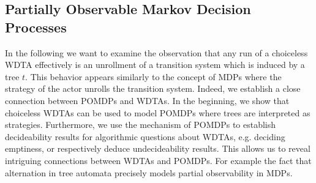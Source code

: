 \subsection{Partially Observable Markov Decision Processes}
\label{sec:modellingpomdp}
In the following we want to examine the observation that any run of a
choiceless \ac{WDTA} effectively is an unrollment of a transition system
which is induced by a tree $t$. This behavior appears similarly to the
concept of \acp{MDP} where the strategy of the actor unrolls the transition
system. Indeed, we establish a close connection between \acp{POMDP} and
\acp{WDTA}. In the beginning, we show that choiceless \acp{WDTA} can be used to
model \acp{POMDP} where trees are interpreted as strategies. Furthermore, we
use the mechanism of \acp{POMDP} to establish decideability results for
algorithmic questions about \acp{WDTA}, e.g. deciding emptiness, or
respectively deduce undecideability results. This allows us to reveal
intriguing connections between \acp{WDTA} and \acp{POMDP}. For example the fact
that alternation in tree automata precisely models partial observability in
\acp{MDP}.

